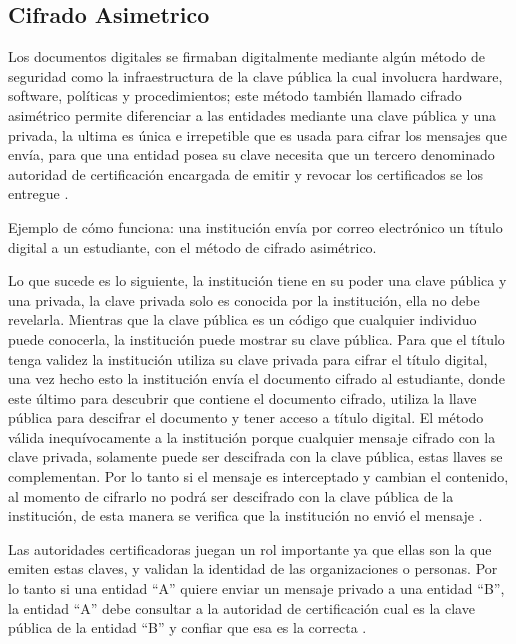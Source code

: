 
\subsection{Cifrado Asimetrico}
Los documentos digitales se firmaban digitalmente
mediante algún método de seguridad como la infraestructura de la clave pública 
la cual involucra hardware, software, políticas y procedimientos; este método también llamado  cifrado asimétrico
permite diferenciar a las entidades mediante una clave pública y una privada, la ultima es única e irrepetible 
que es usada para cifrar los mensajes que envía, para que una entidad posea su clave necesita que un tercero 
denominado autoridad de certificación encargada de emitir y revocar los certificados se los entregue \cite[]{avila_implementacion_2015}.

Ejemplo de cómo funciona:
una institución envía por correo electrónico un título digital a un estudiante, con el método de cifrado asimétrico.


Lo que sucede es lo siguiente, la institución tiene en su poder una clave pública y una privada,
la clave privada solo es conocida por la institución, ella no debe revelarla. Mientras
que la clave pública es un código que cualquier individuo puede conocerla, la institución puede 
mostrar su clave pública.
Para que el título tenga validez la institución utiliza su clave privada para cifrar el título digital, 
una vez hecho esto la institución envía el documento cifrado al estudiante, donde este último
para descubrir que contiene el documento cifrado, utiliza la llave pública para descifrar 
el documento y tener acceso a  título  digital.
El método válida inequívocamente a la institución porque cualquier mensaje 
cifrado con la clave privada, solamente puede ser descifrada con la clave pública, estas llaves
se complementan. Por lo tanto si el mensaje es interceptado y cambian el  contenido, al momento de cifrarlo 
no podrá ser descifrado con la clave pública de la institución, de esta manera se verifica que la institución no envió el mensaje \cite[]{garcia_rojas_implementacion_2008,avila_implementacion_2015,avanzaexportador_certificados_2009}.


Las autoridades certificadoras juegan un rol importante ya que ellas son la que emiten estas claves,
y validan la identidad de las organizaciones o personas. Por lo tanto si una entidad “A” quiere enviar un mensaje
privado a una entidad “B”, la entidad “A” debe consultar a la autoridad de certificación cual es la clave pública de 
la entidad “B” y confiar que esa es la correcta \cite[]{garcia_rojas_implementacion_2008}. 

